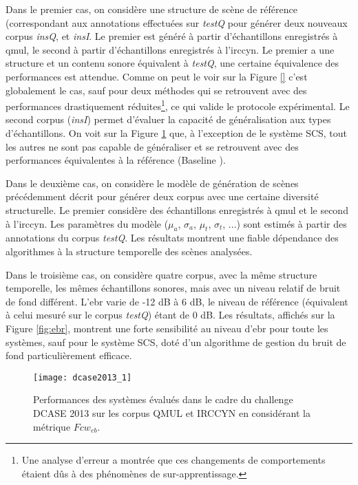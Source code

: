 Dans le premier cas, on considère une structure de scène de référence (correspondant aux annotations effectuées sur \emph{testQ} pour générer deux nouveaux corpus \emph{insQ}, et \emph{insI}. Le premier est généré à partir d'échantillons enregistrés à qmul, le second à partir d'échantillons enregistrés à l'irccyn. Le premier a une structure et un contenu sonore équivalent à \emph{testQ}, une certaine équivalence des performances est attendue. Comme on peut le voir sur la Figure \ref{} c'est globalement le cas, sauf pour deux méthodes qui se retrouvent avec des performances drastiquement réduites\footnote{Une analyse d'erreur a montrée que ces changements de comportements étaient dûs à des phénomènes de sur-apprentissage\cite{lafayhal-01111381}.}, ce qui valide le protocole expérimental. Le second corpus (\emph{insI}) permet d'évaluer la capacité de généralisation aux types d'échantillons. On voit sur la Figure \ref{fig:irccyn} que, à l'exception de le système SCS, tout les autres ne sont pas capable de généraliser et se retrouvent avec des performances équivalentes à la référence (\og Baseline \fg).

Dans le deuxième cas, on considère le modèle de génération de scènes précédemment décrit pour générer deux corpus avec une certaine diversité structurelle. Le premier considère des échantillons enregistrés à qmul et le second à l'irccyn. Les paramètres du modèle ($\mu_a$, $\sigma_a$, $\mu_t$, $\sigma_t$, ...) sont estimés à partir des annotations du corpus \emph{testQ}. Les résultats montrent une fiable dépendance des algorithmes à la structure temporelle des scènes analysées.

Dans le troisième cas, on considère quatre corpus, avec la même structure temporelle, les mêmes échantillons sonores, mais avec un niveau relatif de bruit de fond différent. L'ebr varie de -12 dB à 6 dB, le niveau de référence (équivalent à celui mesuré sur le corpus \emph{testQ})  étant de 0 dB. Les résultats, affichés sur la Figure \ref{fig:ebr}, montrent une forte sensibilité au niveau d'ebr pour toute les systèmes, sauf pour le système SCS, doté d'un algorithme de gestion du bruit de fond particulièrement efficace.

\begin{figure}[t]
\texttt{[image: dcase2013\_1]}
\caption{Performances des systèmes évalués dans le cadre du challenge DCASE 2013 sur les corpus QMUL et IRCCYN en considérant la métrique $Fcw_{eb}$.}
\label{fig:irccyn}
\end{figure}

